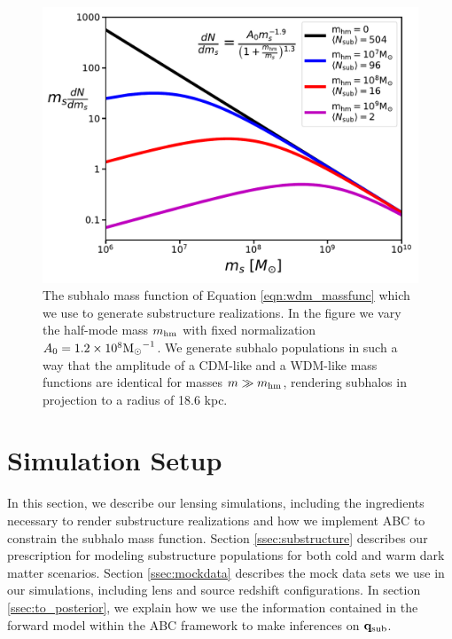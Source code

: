 \begin{figure}
	\centering
	\includegraphics[clip,trim=0cm 0cm 0cm
	0cm,width=.5\textwidth,keepaspectratio]{./figures_ABCforward/mass_function_2.pdf}
	\caption{\label{fig:mass_function} The subhalo mass function of Equation \ref{eqn:wdm_massfunc} which we use to generate substructure realizations. In the figure we vary the half-mode mass $m_{\rm{hm}}$ with fixed normalization $A_0 = 1.2 \times 10^8 {\rm{M}_{\odot}}^{-1}$. We generate subhalo populations in such a way that the amplitude of a CDM-like and a WDM-like mass functions are identical for masses $m \gg m_{\rm{hm}}$, rendering subhalos in projection to a radius of 18.6 kpc.}
\end{figure}

\section{Simulation Setup}
\label{sec:sim_setup}
In this section, we describe our lensing simulations, including the ingredients necessary to render substructure realizations and how we implement ABC to constrain the subhalo mass function. Section \ref{ssec:substructure} describes our prescription for modeling substructure populations for both cold and warm dark matter scenarios. Section \ref{ssec:mockdata} describes the mock data sets we use in our simulations, including lens and source redshift configurations. In section \ref{ssec:to_posterior}, we explain how we use the information contained in the forward model within the ABC framework to make inferences on ${\bf{q}_{\rm{sub}}}$. 

